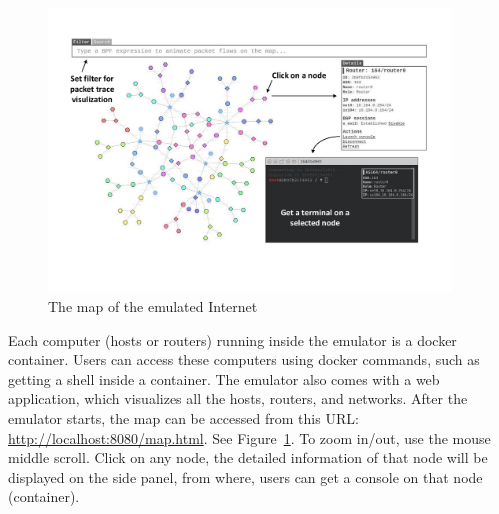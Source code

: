 

\begin{figure}[htb]
  \begin{center}
    \includegraphics[width=0.95\textwidth]{./Figs/emulator_gui.pdf}
  \end{center}
  \caption{The map of the emulated Internet}
  \label{emulator:fig:emulator-gui}
\end{figure}


Each computer (hosts or routers) running inside the emulator is a docker container.
Users can access these computers using docker commands, such as getting a shell
inside a container.
The emulator also comes with a web application, which visualizes all the hosts, routers,
and networks.
After the emulator starts, the map can be accessed from this
URL: \url{http://localhost:8080/map.html}.
See Figure~\ref{emulator:fig:emulator-gui}.
To zoom in/out, use the mouse middle scroll. 
Click on any node, the detailed information of that node
will be displayed on the side panel, from where,
users can get a console on that node (container). 




